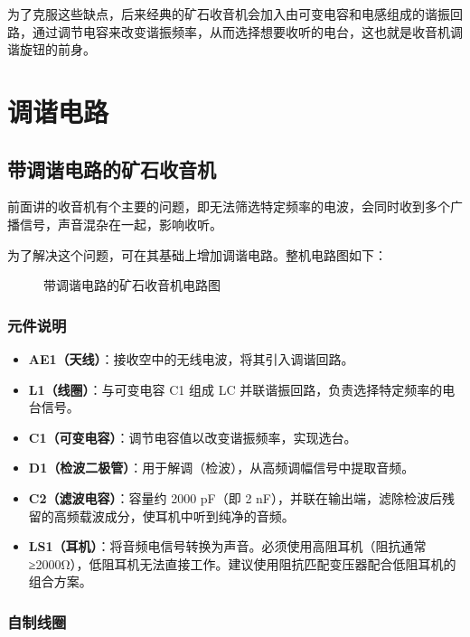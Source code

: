 \documentclass[12pt,UTF8]{ctexbook}
\begin{document}
为了克服这些缺点，后来经典的矿石收音机会加入由可变电容和电感组成的谐振回路，通过调节电容来改变谐振频率，从而选择想要收听的电台，这也就是收音机调谐旋钮的前身。


\chapter{调谐电路}
\label{chap:tuning-circuit}

\section{带调谐电路的矿石收音机}

前面讲的收音机有个主要的问题，即无法筛选特定频率的电波，会同时收到多个广播信号，声音混杂在一起，影响收听。

为了解决这个问题，可在其基础上增加调谐电路。整机电路图如下：

\begin{figure}[H]
	\centering
	\caption{带调谐电路的矿石收音机电路图}
	\label{fig:tuned-crystal-radio}
\end{figure}

\subsection{元件说明}

\begin{itemize}[leftmargin=2cm]
	\item \textbf{AE1（天线）}：接收空中的无线电波，将其引入调谐回路。
	\item \textbf{L1（线圈）}：与可变电容 C1 组成 LC 并联谐振回路，负责选择特定频率的电台信号。
	\item \textbf{C1（可变电容）}：调节电容值以改变谐振频率，实现选台。
	\item \textbf{D1（检波二极管）}：用于解调（检波），从高频调幅信号中提取音频。
	\item \textbf{C2（滤波电容）}：容量约 2000 pF（即 2 nF），并联在输出端，滤除检波后残留的高频载波成分，使耳机中听到纯净的音频。
	\item \textbf{LS1（耳机）}：将音频电信号转换为声音。必须使用高阻耳机（阻抗通常≥2000Ω），低阻耳机无法直接工作。建议使用阻抗匹配变压器配合低阻耳机的组合方案。
\end{itemize}

\subsection{自制线圈}
\end{document}
